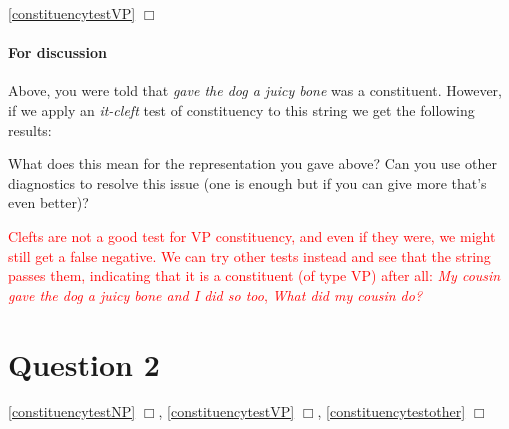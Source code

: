 \documentclass{article}
\begin{document}
\hfill{}\ref{constituencytestVP} $\Box$

\paragraph{For discussion} Above, you were told that \emph{gave the dog a juicy bone} was a constituent.
However, if we apply an \emph{it-cleft} test of constituency to this string we get the following results:
\begin{exe}
\end{exe}
What does this mean for the representation you gave above?
Can you use other diagnostics to resolve this issue (one is enough but if you can give more that's even better)?

\textcolor{red}{Clefts are not a good test for VP constituency, and even if they were, we might still get a false negative. We can try other tests instead and see that the string passes them, indicating that it is a constituent (of type VP) after all: \emph{My cousin gave the dog a juicy bone and I did so too}, \emph{What did my cousin do?}}

\section*{Question 2}
\hfill{}
\ref{constituencytestNP} $\Box$,
\ref{constituencytestVP} $\Box$,
\ref{constituencytestother} $\Box$
\end{document}
